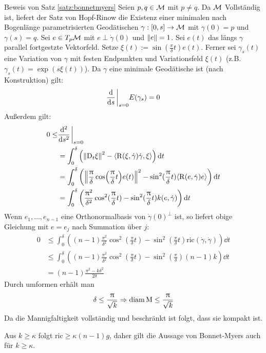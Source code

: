 \begin{bew}{Beweis von Satz \ref{satz:bonnetmyers}}
Seien $p, q \in \mathcal{M}$ mit $p \neq q$.
Da $\mathcal{M}$ Vollständig ist, liefert der Satz von Hopf-Rinow die Existenz einer minimalen
nach Bogenlänge parametrisierten Geodätischen $\gamma: [0 , s] \to \mathcal{M}$ 
mit $\gamma (0) =p$ und $\gamma (s) = q$.
Sei $e \in T_p \mathcal{M}$ mit $e \perp \dot{\gamma}(0)$ und $\norm{e}=1$.
Sei $e(t)$ das längs $\gamma$ parallel fortgestzte Vektorfeld.
Setze $\xi (t) := \sin (\frac{\pi}{\delta} t) e(t)$.
Ferner sei $\gamma_s (t)$ eine Variation von $\gamma$ mit festen Endpunkten und
Variationsfeld $\xi (t)$ (z.B. $\gamma_s (t) = \exp (s \xi (t))$).
Da $\gamma$ eine minimale Geodätische ist (nach Konstruktion) gilt:
\begin{align*}
    \dv{s} \eval_{s=0}E(\gamma_s) = 0 \\
\end{align*}
Außerdem gilt:
\begin{align*}
0 \leq & \dv[2]{s}\eval_{s=0} \\
&= \int^\delta_0 \left( \norm{\covd_t \xi}^2 - \langle \curv(\xi, \dot{\gamma}) \dot{\gamma}
, \xi \rangle \right) \dd t\\
&= \int^\delta_0 \left( \norm{ \frac{\pi}{\delta} \cos (\frac{\pi}{\delta} t) e(t) }^2
- \sin^2 (\frac{\pi}{\delta}t) \langle \curv (e, \dot{\gamma})e \rangle \right) \dd t \\
&= \int^\delta_0 \left( \frac{\pi^2}{\delta^2} \cos^2 (\frac{\pi}{\delta} t ) - 
\sin^2 (\frac{\pi}{\delta} t ) k (e, \dot{\gamma}) \right) \dd t
\end{align*}
Wenn $e_1, \dots, e_{n-1}$ eine Orthonormalbasis von $\dot{\gamma} (0)^\perp$ ist, 
so liefert obige Gleichung mit $e= e_j$ nach Summation über $j$:
\begin{align*}
0 &\leq \int^\delta_0 \left( (n-1) \frac{\pi^2}{\delta^2} 
    \cos^2 (\frac{\pi}{\delta} t) - \sin^2 (\frac{\pi}{\delta}t ) 
\text{ric}(\dot{\gamma}, \dot{\gamma}) \right) \dd t \\
&\leq \int^\delta_0 \left( (n-1) \frac{\pi^2}{\delta^2} \cos^2 (\frac{\pi}{\delta}t ) 
- \sin^2 (\frac{\pi}{\delta} ) (n-1)k \right) \dd t \\
&= (n-1) \frac{\pi^2 - k \delta^2}{2\delta}
\end{align*}
Durch umformen erhält man
\begin{align}
    \delta \leq \frac{\uppi}{\sqrt{k}} \Rightarrow \operatorname{diam} \mathrm{M} \leq \frac{\uppi}{\sqrt{k}}
\end{align}
Da die Mannigfaltigkeit vollständig und beschränkt ist folgt, dass sie kompakt ist.
\end{bew}
\begin{bem}
Aus $k \geq \kappa$ folgt $\text{ric} \geq \kappa (n-1)g$,
daher gilt die Aussage von Bonnet-Myers auch für $k \geq \kappa$.
\end{bem}

